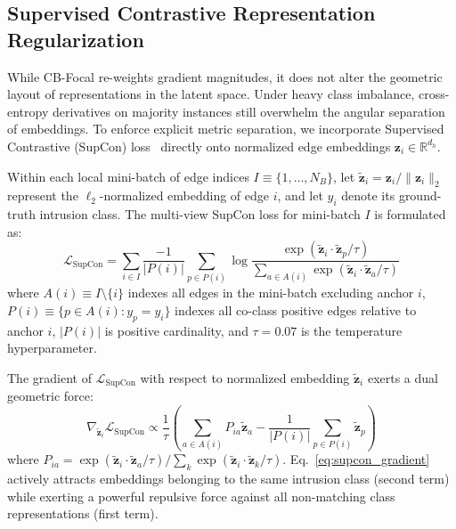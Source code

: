 \documentclass[journal,onecolumn]{IEEEtran}
\begin{document}
\subsection{Supervised Contrastive Representation Regularization}
While CB-Focal re-weights gradient magnitudes, it does not alter the geometric layout of representations in the latent space. Under heavy class imbalance, cross-entropy derivatives on majority instances still overwhelm the angular separation of embeddings. To enforce explicit metric separation, we incorporate Supervised Contrastive (SupCon) loss~\cite{khosla2020supcon} directly onto normalized edge embeddings $\boldsymbol{z}_i \in \mathbb{R}^{d_h}$.

Within each local mini-batch of edge indices $I \equiv \{1, \dots, N_B\}$, let $\tilde{\boldsymbol{z}}_i = \boldsymbol{z}_i / \|\boldsymbol{z}_i\|_2$ represent the $\ell_2$-normalized embedding of edge $i$, and let $y_i$ denote its ground-truth intrusion class. The multi-view SupCon loss for mini-batch $I$ is formulated as:
\begin{equation}
\mathcal{L}_{\text{SupCon}} = \sum_{i \in I} \frac{-1}{|P(i)|} \sum_{p \in P(i)} \log \frac{\exp\left(\tilde{\boldsymbol{z}}_i \cdot \tilde{\boldsymbol{z}}_p / \tau\right)}{\sum_{a \in A(i)} \exp\left(\tilde{\boldsymbol{z}}_i \cdot \tilde{\boldsymbol{z}}_a / \tau\right)}
\label{eq:supcon_loss}
\end{equation}
where $A(i) \equiv I \setminus \{i\}$ indexes all edges in the mini-batch excluding anchor $i$, $P(i) \equiv \{p \in A(i) : y_p = y_i\}$ indexes all co-class positive edges relative to anchor $i$, $|P(i)|$ is positive cardinality, and $\tau = 0.07$ is the temperature hyperparameter.

The gradient of $\mathcal{L}_{\text{SupCon}}$ with respect to normalized embedding $\tilde{\boldsymbol{z}}_i$ exerts a dual geometric force:
\begin{equation}
\nabla_{\tilde{\boldsymbol{z}}_i} \mathcal{L}_{\text{SupCon}} \propto \frac{1}{\tau} \left( \sum_{a \in A(i)} P_{ia} \tilde{\boldsymbol{z}}_a - \frac{1}{|P(i)|} \sum_{p \in P(i)} \tilde{\boldsymbol{z}}_p \right)
\label{eq:supcon_gradient}
\end{equation}
where $P_{ia} = \exp(\tilde{\boldsymbol{z}}_i \cdot \tilde{\boldsymbol{z}}_a / \tau) / \sum_{k} \exp(\tilde{\boldsymbol{z}}_i \cdot \tilde{\boldsymbol{z}}_k / \tau)$. Eq.~\ref{eq:supcon_gradient} actively attracts embeddings belonging to the same intrusion class (second term) while exerting a powerful repulsive force against all non-matching class representations (first term).
\end{document}
